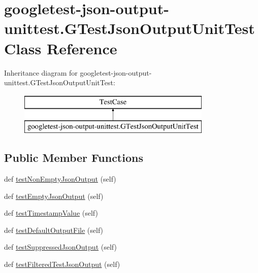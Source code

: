 \hypertarget{classgoogletest-json-output-unittest_1_1_g_test_json_output_unit_test}{}\section{googletest-\/json-\/output-\/unittest.G\+Test\+Json\+Output\+Unit\+Test Class Reference}
\label{classgoogletest-json-output-unittest_1_1_g_test_json_output_unit_test}
Inheritance diagram for googletest-\/json-\/output-\/unittest.G\+Test\+Json\+Output\+Unit\+Test\+:\begin{figure}[H]
\begin{center}
\leavevmode
\includegraphics[height=2.000000cm]{d4/d7d/classgoogletest-json-output-unittest_1_1_g_test_json_output_unit_test}
\end{center}
\end{figure}
\subsection*{Public Member Functions}
\begin{DoxyCompactItemize}
\item 
def \mbox{\hyperlink{classgoogletest-json-output-unittest_1_1_g_test_json_output_unit_test_ab5520f22133356e62a54cdb5756504bc}{test\+Non\+Empty\+Json\+Output}} (self)
\item 
def \mbox{\hyperlink{classgoogletest-json-output-unittest_1_1_g_test_json_output_unit_test_ad8f3712a87e4c54bb475103793975482}{test\+Empty\+Json\+Output}} (self)
\item 
def \mbox{\hyperlink{classgoogletest-json-output-unittest_1_1_g_test_json_output_unit_test_afceaa6545170996b286e610e31f2e403}{test\+Timestamp\+Value}} (self)
\item 
def \mbox{\hyperlink{classgoogletest-json-output-unittest_1_1_g_test_json_output_unit_test_a6003d1c583fc2ded1ab5276fc82cb1c9}{test\+Default\+Output\+File}} (self)
\item 
def \mbox{\hyperlink{classgoogletest-json-output-unittest_1_1_g_test_json_output_unit_test_aeae00520b90ff69e832cf6a676219cf8}{test\+Suppressed\+Json\+Output}} (self)
\item 
def \mbox{\hyperlink{classgoogletest-json-output-unittest_1_1_g_test_json_output_unit_test_abc55ae0ca4d9b3d265b10bbbcc6e720e}{test\+Filtered\+Test\+Json\+Output}} (self)
\end{DoxyCompactItemize}
